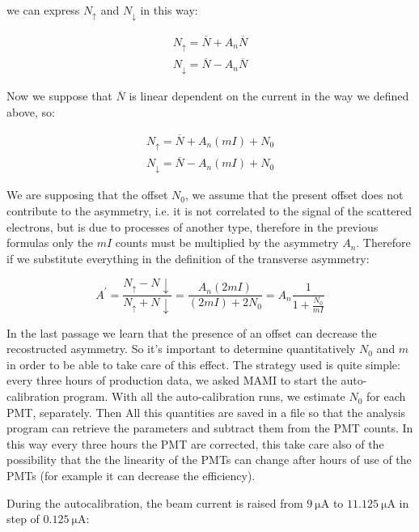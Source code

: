 we can express $N_{\uparrow}$ and $N_{\downarrow}$ in this way:

\begin{align*}
N_{\uparrow} = \overline{N} + A_{n}\overline{N} \\
N_{\downarrow} = \overline{N} - A_{n}\overline{N} 
\end{align*}

Now we suppose that $\overline{N}$ is linear dependent on the current in the way we defined above, so:

\begin{align*}
N_{\uparrow} = \overline{N} + A_{n}(mI) + N_{0} \\
N_{\downarrow} = \overline{N} - A_{n}(mI) + N_{0} 
\end{align*}

We are supposing that the offset $N_{0}$, we assume that the present offset does not contribute to the asymmetry, i.e. it is not correlated to the signal of the scattered electrons, but is due to processes of another type, therefore in the previous formulas only the $mI$ counts must be multiplied by the asymmetry $A_{n}$. Therefore if we substitute everything in the definition of the transverse asymmetry:

\begin{equation} \label{eq:Systematic}
A^{'} = \dfrac{N_{\uparrow} - N{\downarrow}}{N_{\uparrow} + N{\downarrow}} = \dfrac{A_{n} (2mI)}{ (2mI) + 2N_{0} } = A_{n} \dfrac{1}{1 + \frac{N_{0}}{mI}}
\end{equation} 

In the last passage we learn that the presence of an offset can decrease the recostructed asymmetry. So it's important to determine quantitatively $N_{0}$ and $m$ in order to be able to take care of this effect. The strategy used is quite simple: every three hours of production data, we asked MAMI to start the auto-calibration program. With all the auto-calibration runs, we estimate $N_{0}$ for each PMT, separately. Then All this quantities are saved in a file so that the analysis program can retrieve the parameters and subtract them from the PMT counts. \medskip
In this way every three hours the PMT are corrected, this take care also of the possibility that the the linearity of the PMTs can change after hours of use of the PMTs (for example it can decrease the efficiency).

During the autocalibration, the beam current is raised from $\SI{9}{\micro \ampere}$ to $\SI{11.125}{\micro \ampere}$ in step of $\SI{0.125}{\micro \ampere}$:

